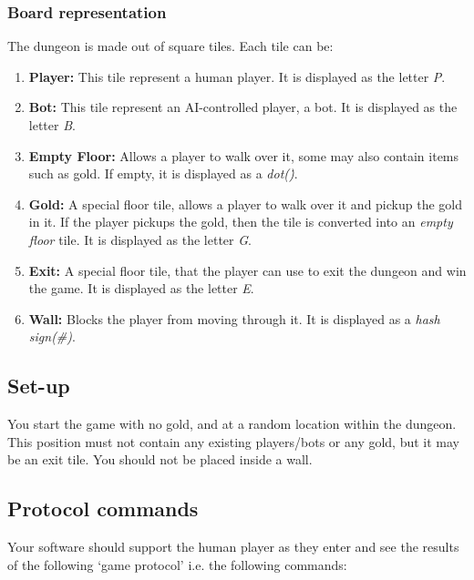 \documentclass{article}
\begin{document}
\subsubsection{Board representation}
The dungeon is made out of square tiles. Each tile can be:
\begin{enumerate}
\item{\textbf{Player:}} This tile represent a human player. It is displayed as the letter \textit{P}.

\item{\textbf{Bot:}} This tile represent an AI-controlled player, a bot. It is displayed as the letter \textit{B}.

\item{\textbf{Empty Floor:}} Allows a player to walk over it, some may also contain items such as gold. If empty, it is displayed as a \textit{dot(\.)}.

\item{\textbf{Gold:}} A special floor tile, allows a player to walk over it and pickup the gold in it. If the player pickups the gold, then the tile is converted into an \textit{empty floor} tile. It is displayed as the letter \textit{G}.

\item{\textbf{Exit:}} A special floor tile, that the player can use to exit the dungeon and win the game. It is displayed as the letter \textit{E}.

\item{\textbf{Wall:}} Blocks the player from moving through it. It is displayed as a \textit{hash sign(\#)}.
\end{enumerate}

\subsection{Set-up}
You start the game with no gold, and at a random location within the dungeon. This position must not contain any existing players/bots or any gold, but it may be an exit tile. You should not be placed inside a wall. 

\subsection{Protocol commands}
Your software should support the human player as they enter and see the results of the following `game protocol' i.e. the following commands: 
\end{document}
